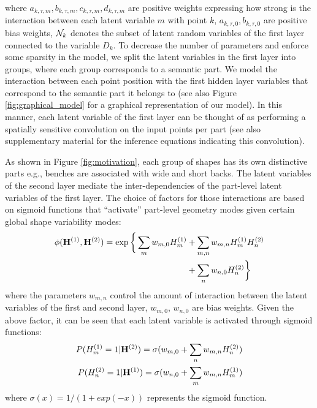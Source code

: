 where $a_{k,\tau,m}, b_{k,\tau,m},c_{k,\tau,m},d_{k,\tau,m}$ are positive weights expressing how strong is the interaction  between each latent variable $m$ with point $k$, $a_{k,\tau,0}, b_{k,\tau,0}$ are positive bias weights, $\mathcal{N}_k$ denotes the subset of latent random variables of the first layer connected to the variable $D_k$. To decrease the number of parameters and enforce some sparsity in the model, we split the latent variables in the first layer into groups, where each group corresponds to a semantic part. We model the interaction between each point position with the first hidden layer variables that correspond to the semantic part it belongs to (see also Figure \ref{fig:graphical_model} for a graphical representation of our model). In this manner, each latent variable of the first layer can be thought of as performing a spatially sensitive convolution on the input points per part (see also supplementary material for the inference equations indicating this convolution).

As shown in Figure \ref{fig:motivation}, each group of shapes has its own distinctive parts e.g., benches are associated with wide and short backs. The latent variables of the second layer mediate the inter-dependencies of the part-level latent variables of the first layer. The choice of factors for those interactions are based on sigmoid functions that ``activate'' part-level geometry modes given certain global shape variability modes: 
\begin{align*}
\phi( \mathbf{H}^{(1)}, \mathbf{H}^{(2)} ) = \exp \bigg\{ \sum\limits_m w_{m, 0} H_m^{(1)} & + \sum\limits_{m,n} w_{m, n} H_m^{(1)} H_n^{(2)} \nonumber \\ 
& + \sum\limits_n w_{n, 0} H_n^{(2)} \bigg\}
\end{align*}
where the parameters $w_{m,n}$ control the amount of interaction between the latent variables of the first and second layer, $w_{m, 0}$, $w_{n, 0}$ are bias weights. Given the above factor, it can be seen that each latent variable is activated through sigmoid functions:
\begin{align*}
P( H_m^{(1)} = 1 | \mathbf{H}^{(2)} ) = \sigma ( w_{m, 0} + \sum\limits_{n} w_{m, n} H_n^{(2)} ) \\
P( H_n^{(2)} = 1 | \mathbf{H}^{(1)} ) = \sigma ( w_{n, 0} + \sum\limits_{m} w_{m, n} H_m^{(1)} ) 
\end{align*}
where $\sigma(x)=1/(1+exp(-x))$ represents the sigmoid function. 



